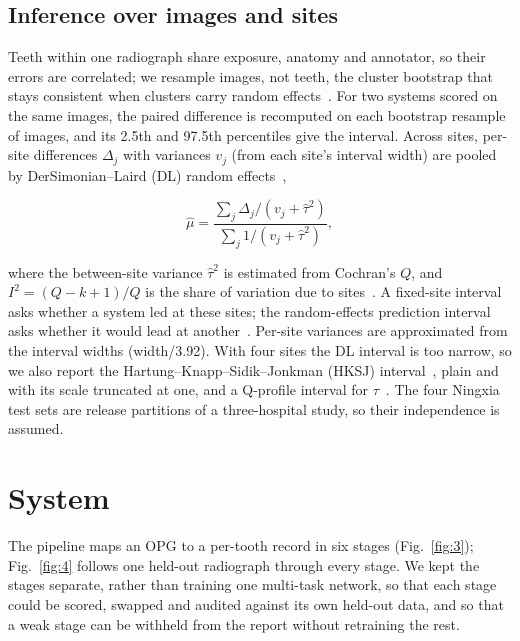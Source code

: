 \documentclass[conference]{IEEEtran}
\begin{document}
\subsection{Inference over images and sites}

Teeth within one radiograph share exposure, anatomy and annotator, so their errors are correlated; we resample images, not teeth, the cluster bootstrap that stays consistent when clusters carry random effects~\cite{field2007bootstrapping}. For two systems scored on the same images, the paired difference is recomputed on each bootstrap resample of images, and its 2.5th and 97.5th percentiles give the interval. Across sites, per-site differences $\Delta_j$ with variances $v_j$ (from each site's interval width) are pooled by DerSimonian–Laird (DL) random effects~\cite{dersimonian1986meta},

\begin{equation}
\hat\mu = \frac{\sum_j \Delta_j / (v_j + \hat\tau^2)}{\sum_j 1 / (v_j + \hat\tau^2)},
\end{equation}

where the between-site variance $\hat\tau^2$ is estimated from Cochran's $Q$, and $I^2 = (Q - k + 1)/Q$ is the share of variation due to sites~\cite{higgins2002quantifying}. A fixed-site interval asks whether a system led at these sites; the random-effects prediction interval asks whether it would lead at another~\cite{riley2011interpretation}. Per-site variances are approximated from the interval widths (width/3.92). With four sites the DL interval is too narrow, so we also report the Hartung–Knapp–Sidik–Jonkman (HKSJ) interval~\cite{inthout2014hartung}, plain and with its scale truncated at one, and a Q-profile interval for $\tau$~\cite{viechtbauer2007confidence}. The four Ningxia test sets are release partitions of a three-hospital study, so their independence is assumed.

\section{System}

The pipeline maps an OPG to a per-tooth record in six stages (Fig.~\ref{fig:3}); Fig.~\ref{fig:4} follows one held-out radiograph through every stage. We kept the stages separate, rather than training one multi-task network, so that each stage could be scored, swapped and audited against its own held-out data, and so that a weak stage can be withheld from the report without retraining the rest.
\end{document}
